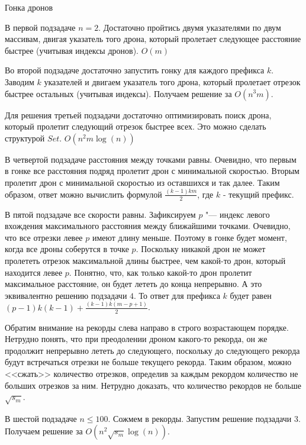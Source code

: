 \begin{tutorial}{Гонка дронов}

\ifdefined\tutorialbox {} \fi

В первой подзадаче $n=2$. Достаточно пройтись двумя указателями по двум массивам, двигая указатель того дрона, который пролетает следующее расстояние быстрее (учитывая индексы дронов). $O(m)$

Во второй подзадаче достаточно запустить гонку для каждого префикса $k$. Заводим $k$ указателей и двигаем указатель того дрона, который пролетает отрезок быстрее остальных (учитывая индексы). Получаем решение за $O(n^3 m)$.

Для решения третьей подзадачи достаточно оптимизировать поиск дрона, который пролетит следующий отрезок быстрее всех. Это можно сделать структурой $Set$. $O(n^2 m \log(n))$

В четвертой подзадаче расстояния между точками равны. Очевидно, что первым в гонке все расстояния подряд пролетит дрон с минимальной скоростью. Вторым пролетит дрон с минимальной скоростью из оставшихся и так далее. Таким образом, ответ можно вычислить формулой $\frac{(k-1) k m}{2}$, где $k$ - текущий префикс. 

В пятой подзадаче все скорости равны. Зафиксируем $p$ "--- индекс левого вхождения максимального расстояния между ближайшими точками. Очевидно, что все отрезки левее $p$ имеют длину меньше. Поэтому в гонке будет момент, когда все дроны соберутся в точке $p$. Поскольку никакой дрон не может пролететь отрезок максимальной длины быстрее, чем какой-то дрон, который находится левее $p$. Понятно, что, как только какой-то дрон пролетит максимальное расстояние, он будет лететь до конца непрерывно. А это эквивалентно решению подзадачи $4$. То ответ для префикса $k$ будет равен $(p-1) k (k-1) + \frac{(k-1) k (m-p+1)}{2}$.

Обратим внимание на рекорды слева направо в строго возрастающем порядке. Нетрудно понять, что при преодолении дроном какого-то рекорда, он же продолжит непрерывно лететь до следующего, поскольку до следующего рекорда будут встречаться отрезки не больше текущего рекорда. Таким образом, можно <<сжать>> количество отрезков, определив за каждым рекордом количество не больших отрезков за ним. Нетрудно доказать, что количество рекордов не больше $\sqrt{s_m}$.


В шестой подзадаче $n \le 100$. Сожмем в рекорды. Запустим решение подзадачи $3$. Получаем решение за $O(n^2 \sqrt{s_m} \log(n))$.


\end{tutorial}
